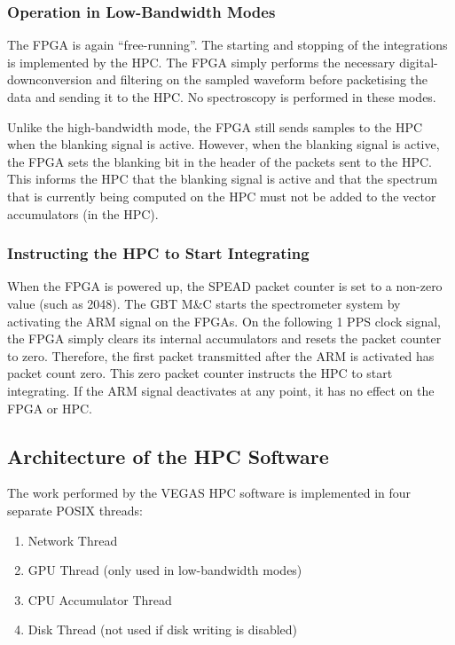 \documentclass[11pt]{article} %
\begin{document}
\subsubsection {Operation in Low-Bandwidth Modes}

The FPGA is again ``free-running''. The starting and stopping of the integrations is implemented by the HPC. The FPGA simply performs the necessary digital-downconversion and filtering on the sampled waveform before packetising the data and sending it to the HPC. No spectroscopy is performed in these modes.

Unlike the high-bandwidth mode, the FPGA still sends samples to the HPC when the blanking signal is active. However, when the blanking signal is active, the FPGA sets the blanking bit in the header of the packets sent to the HPC. This informs the HPC that the blanking signal is active and that the spectrum that is currently being computed on the HPC must not be added to the vector accumulators (in the HPC).

\subsubsection{Instructing the HPC to Start Integrating}

When the FPGA is powered up, the SPEAD packet counter is set to a non-zero value (such as 2048). The GBT M\&C starts the spectrometer system by activating the ARM signal on the FPGAs. On the following 1 PPS clock signal, the FPGA simply clears its internal accumulators and resets the packet counter to zero. Therefore, the first packet transmitted after the ARM is activated has packet count zero. This zero packet counter instructs the HPC to start integrating. If the ARM signal deactivates at any point, it has no effect on the FPGA or HPC.

\subsection{Architecture of the HPC Software}

The work performed by the VEGAS HPC software is implemented in four separate POSIX threads:
\begin{enumerate}
\item Network Thread
\item GPU Thread (only used in low-bandwidth modes)
\item CPU Accumulator Thread
\item Disk Thread (not used if disk writing is disabled)
\end{enumerate}
\end{document}

